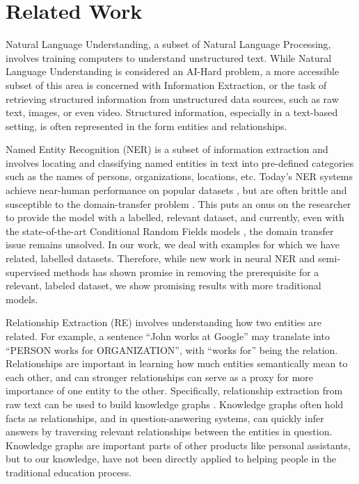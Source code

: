 \documentclass[11pt,a4paper]{article}
\begin{document}
\section{Related Work}
% 

Natural Language Understanding, a subset of Natural Language Processing, involves training computers to understand unstructured text. While Natural Language Understanding is considered an AI-Hard problem, a more accessible subset of this area is concerned with Information Extraction, or the task of retrieving structured information from unstructured data sources, such as raw text, images, or even video. Structured information, especially in a text-based setting, is often represented in the form entities and relationships. 

Named Entity Recognition (NER) is a subset of information extraction and involves locating and classifying named entities in text into pre-defined categories such as the names of persons, organizations, locations, etc. Today’s NER systems achieve near-human performance on popular datasets \cite{M98-1002}, but are often brittle and susceptible to the domain-transfer problem \cite{Poibeau01propername}. This puts an onus on the researcher to provide the model with a labelled, relevant dataset, and currently, even with the state-of-the-art Conditional Random Fields models \cite{Finkel:2005:INI:1219840.1219885}, the domain transfer issue remains unsolved. In our work, we deal with examples for which we have related, labelled datasets. Therefore, while new work in neural NER and semi-supervised methods \cite{Turian:2010:WRS:1858681.1858721} \cite{Lin:2009:PCD:1690219.1690290} has shown promise in removing the prerequisite for a relevant, labeled dataset, we show promising results with more traditional models.

Relationship Extraction (RE) involves understanding how two entities are related. For example, a sentence “John works at Google” may translate into “PERSON works for ORGANIZATION”, with “works for” being the relation. Relationships are important in learning how much entities semantically mean to each other, and can stronger relationships can serve as a proxy for more importance of one entity to the other. Specifically, relationship extraction from raw text can be used to build knowledge graphs \cite{Ramakrishnan:2006:FSR:2127045.2127088}. Knowledge graphs often hold facts as relationships, and in question-answering systems, can quickly infer answers by traversing relevant relationships between the entities in question. Knowledge graphs are important parts of other products like personal assistants, but to our knowledge, have not been directly applied to helping people in the traditional education process.
\end{document}

